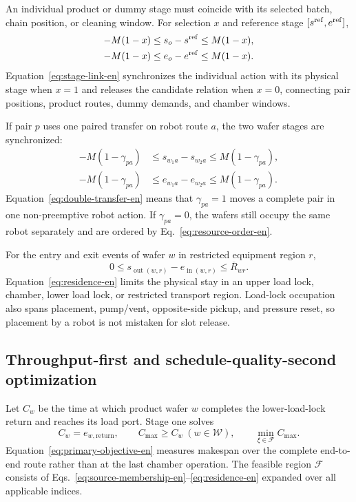 \documentclass[final,5p,times,twocolumn]{elsarticle}
\begin{document}
An individual product or dummy stage must coincide with its selected batch, chain position, or cleaning window. For selection $x$ and reference stage $[s^{\rm ref},e^{\rm ref}]$,
\begin{equation}
\begin{aligned}
-M(1-x)&\le s_o-s^{\rm ref}\le M(1-x),\\
-M(1-x)&\le e_o-e^{\rm ref}\le M(1-x).
\end{aligned}
\label{eq:stage-link-en}
\end{equation}
Equation~\eqref{eq:stage-link-en} synchronizes the individual action with its physical stage when $x=1$ and releases the candidate relation when $x=0$, connecting pair positions, product routes, dummy demands, and chamber windows.

If pair $p$ uses one paired transfer on robot route $a$, the two wafer stages are synchronized:
\begin{equation}
\begin{aligned}
-M(1-\gamma_{pa})&\le s_{w_1a}-s_{w_2a}\le M(1-\gamma_{pa}),\\
-M(1-\gamma_{pa})&\le e_{w_1a}-e_{w_2a}\le M(1-\gamma_{pa}).
\end{aligned}
\label{eq:double-transfer-en}
\end{equation}
Equation~\eqref{eq:double-transfer-en} means that $\gamma_{pa}=1$ moves a complete pair in one non-preemptive robot action. If $\gamma_{pa}=0$, the wafers still occupy the same robot separately and are ordered by Eq.~\eqref{eq:resource-order-en}.

For the entry and exit events of wafer $w$ in restricted equipment region $r$,
\begin{equation}
0\le s_{\operatorname{out}(w,r)}-e_{\operatorname{in}(w,r)}
\le\overline R_{wr}.
\label{eq:residence-en}
\end{equation}
Equation~\eqref{eq:residence-en} limits the physical stay in an upper load lock, chamber, lower load lock, or restricted transport region. Load-lock occupation also spans placement, pump/vent, opposite-side pickup, and pressure reset, so placement by a robot is not mistaken for slot release.

\subsection{Throughput-first and schedule-quality-second optimization}

Let $C_w$ be the time at which product wafer $w$ completes the lower-load-lock return and reaches its load port. Stage one solves
\begin{equation}
C_w=e_{w,\mathrm{return}},\qquad
C_{\max}\ge C_w\ (w\in\mathcal W),\qquad
\min_{\xi\in\mathcal F}C_{\max}.
\label{eq:primary-objective-en}
\end{equation}
Equation~\eqref{eq:primary-objective-en} measures makespan over the complete end-to-end route rather than at the last chamber operation. The feasible region $\mathcal F$ consists of Eqs.~\eqref{eq:source-membership-en}--\eqref{eq:residence-en} expanded over all applicable indices.
\end{document}
